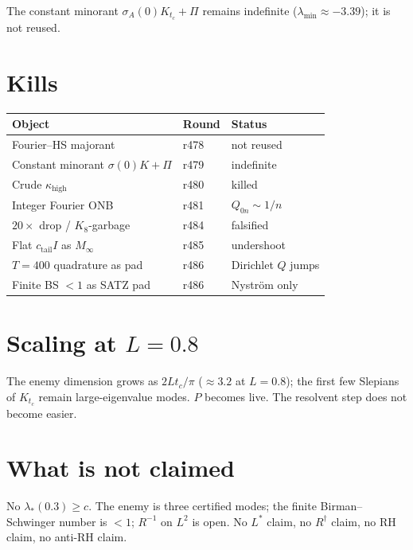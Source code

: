 \documentclass[11pt]{article}
\theoremstyle{remark}
\begin{document}
The constant minorant
$\sigma_A(0)K_{t_c}+\Pi$ remains indefinite
($\lambda_{\min}\approx-3.39$); it is not reused.

\section{Kills}

\begin{center}
\small
\begin{tabular}{@{}lll@{}}
\toprule
Object & Round & Status \\
\midrule
Fourier--HS majorant & r478 & not reused \\
Constant minorant $\sigma(0)K+\Pi$ & r479 & indefinite \\
Crude $\kappa_{\mathrm{high}}$ & r480 & killed \\
Integer Fourier ONB & r481 & $Q_{0n}\sim1/n$ \\
$20\times$ drop / $K_8$-garbage & r484 & falsified \\
Flat $c_{\mathrm{tail}}I$ as $M_\infty$ & r485 & undershoot \\
$T=400$ quadrature as pad & r486 & Dirichlet $Q$ jumps \\
Finite BS $<1$ as SATZ pad & r486 & Nystr\"om only \\
\bottomrule
\end{tabular}
\end{center}

\section{Scaling at $L=0.8$}

The enemy dimension grows as $2Lt_c/\pi$
($\approx 3.2$ at $L=0.8$); the first few
Slepians of $K_{t_c}$ remain large-eigenvalue
modes.  $P$ becomes live.  The resolvent step
does not become easier.

\section{What is not claimed}

No $\lambda_*(0.3)\ge c$.
The enemy is three certified modes; the finite
Birman--Schwinger number is $<1$;
$R^{-1}$ on $L^2$ is open.
No $L^*$ claim, no $R^\dagger$ claim, no RH claim,
no anti-RH claim.
\end{document}
